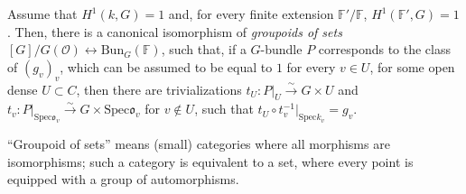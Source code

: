 \begin{proposition}
 \label{proposition-BunG}
Assume that $H^1(k,G)=1$ and, for every finite extension $\mathbb F'/\mathbb F$, $H^1(\mathbb F',G)=1$. Then, 
there is a canonical isomorphism of \emph{groupoids of sets} $[G]/G(\mathcal O) \leftrightarrow \text{Bun}_G(\mathbb F)$, such that, if a $G$-bundle $P$ corresponds to the class of $(g_v)_v$, which can be assumed to be equal to $1$ for every $v\in U$, for some open dense $U\subset C$, then there are trivializations $t_U: P|_U\xrightarrow\sim G\times U$ and $t_v: P|_{\text{Spec} \mathfrak o_v} \xrightarrow\sim G\times \text{Spec} \mathfrak o_v$ for $v\notin U$, such that $t_U \circ t_v^{-1}|_{\text{Spec} k_v} = g_v$.
\end{proposition}

``Groupoid of sets'' means (small) categories where all morphisms are isomorphisms; such a category is equivalent to a set, where every point is equipped with a group of automorphisms.


